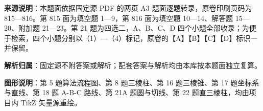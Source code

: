 

\begin{gknotice}
\textbf{来源说明}：本题面依据固定源 PDF 的两页 A3 题面逐题转录，原卷印刷页码为 815—816。第 815 面为填空题 1—9，第 816 面为填空题 10—14、解答题 15—20、附加题 21—23。第 21 题为四选二，A、B、C、D 四个小题全部收录；为便于检索，四个小题分别以（1）—（4）标记，原卷的【A】【B】【C】【D】标识一并保留。

\textbf{解析归属}：固定源不附答案或解析；配套答案与解析均由本库按本题面独立复算。

\textbf{图形说明}：第 5 题算法流程图、第 8 题三棱柱、第 16 题三棱锥、第 17 题坐标系与直线、第 18 题 A-B-C 路线、第 21A 题圆与切线、第 22 题直三棱柱，均由项目内 TikZ 矢量源重绘。
\end{gknotice}


